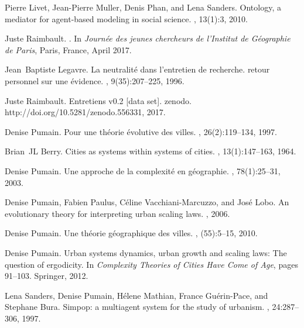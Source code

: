 \documentclass[runningheads,a4paper]{llncs2e/llncs}
\begin{document}
\begin{thebibliography}{10}
Pierre Livet, Jean-Pierre Muller, Denis Phan, and Lena Sanders.
\newblock Ontology, a mediator for agent-based modeling in social science.
, 13(1):3,
  2010.

Juste Raimbault.
.
\newblock In {\em {Journ{\'e}e des jeunes chercheurs de l'Institut de
  G{\'e}ographie de Paris}}, Paris, France, April 2017.

Jean~Baptiste Legavre.
\newblock La {\guillemotleft}neutralit{\'e}{\guillemotright} dans l'entretien
  de recherche. retour personnel sur une {\'e}vidence.
, 9(35):207--225, 1996.

Juste Raimbault.
\newblock Entretiens v0.2 [data set]. zenodo.
  http://doi.org/10.5281/zenodo.556331, 2017.

Denise Pumain.
\newblock Pour une th{\'e}orie {\'e}volutive des villes.
, 26(2):119--134, 1997.

Brian~JL Berry.
\newblock Cities as systems within systems of cities.
, 13(1):147--163, 1964.

Denise Pumain.
\newblock Une approche de la complexit{\'e} en g{\'e}ographie.
, 78(1):25--31, 2003.

Denise Pumain, Fabien Paulus, C{\'e}line Vacchiani-Marcuzzo, and Jos{\'e} Lobo.
\newblock An evolutionary theory for interpreting urban scaling laws.
, 2006.

Denise Pumain.
\newblock Une th{\'e}orie g{\'e}ographique des villes.
,
  (55):5--15, 2010.

Denise Pumain.
\newblock Urban systems dynamics, urban growth and scaling laws: The question
  of ergodicity.
\newblock In {\em Complexity Theories of Cities Have Come of Age}, pages
  91--103. Springer, 2012.

Lena Sanders, Denise Pumain, H{\'e}lene Mathian, France Gu{\'e}rin-Pace, and
  Stephane Bura.
\newblock Simpop: a multiagent system for the study of urbanism.
, 24:287--306, 1997.


\end{thebibliography}
\end{document}
